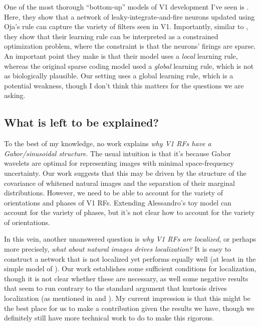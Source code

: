 One of the most thorough ``bottom-up'' models of V1 development I've seen is \cite{zylberberg2011sparse}.
Here, they show that a network of leaky-integrate-and-fire neurons updated using Oja's rule can capture the variety of filters seen in V1.
Importantly, similar to \cite{brito2016nonlinear}, they show that their learning rule can be interpreted as a constrained optimization problem, where the constraint is that the neurons' firings are sparse.
An important point they make is that their model uses a \emph{local} learning rule, whereas the original sparse coding model used a \emph{global} learning rule, which is not as biologically plausible.
Our setting uses a global learning rule, which is a potential weakness, though I don't think this matters for the questions we are asking.

\subsection*{What is left to be explained?}
To the best of my knowledge, no work explains \emph{why V1 RFs have a Gabor/sinusoidal structure}.
The usual intuition is that it's because Gabor wavelets are optimal for representing images with minimal space-frequency uncertainty.
Our work suggests that this may be driven by the structure of the covariance of whitened natural images and the separation of their marginal distributions.
However, we need to be able to account for the variety of orientations and phases of V1 RFs.
Extending Alessandro's toy model can account for the variety of phases, but it's not clear how to account for the variety of orientations.

In this vein, another unanswered question is \emph{why V1 RFs are localized}, or perhaps more precisely, \emph{what about natural images drives localization?}
It is easy to construct a network that is not localized yet performs equally well (at least in the simple model of \cite{ingrosso2022data}).
Our work establishes some sufficient conditions for localization, though it is not clear whether these are necessary, as well some negative results that seem to run contrary to the standard argument that kurtosis drives localization (as mentioned in \cite{brito2016nonlinear} and \cite{ingrosso2022data}).
My current impression is that this might be the best place for us to make a contribution given the results we have, though we definitely still have more technical work to do to make this rigorous.

